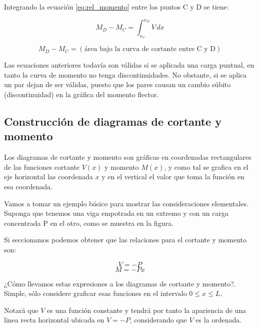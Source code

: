 \documentclass[12pt,letterpaper]{article}
\begin{document}
Integrando la ecuación \ref{eq:rel_momento} entre los puntos C y D se tiene:

\begin{equation}\label{eq:int_momento}
M_D - M_C = \int_{x_C}^{x_D} V \, dx
\end{equation}

$$ M_D - M_C = (\text{área bajo la curva de cortante entre C y D}) $$

Las ecuaciones anteriores todavía son válidas si se aplicada una carga puntual, 
en tanto la curva de momento no tenga discontinuidades. No obstante, si se 
aplica un par dejan de ser válidas, puesto que los pares causan un cambio 
súbito (discontinuidad) en la gráfica del momento flector.


\subsection{Construcción de diagramas de cortante y momento}

Los diagramas de cortante y momento son gráficas en coordenadas rectangulares de las 
funciones cortante $V(x)$ y momento $M(x)$, y como tal se grafica en el eje horizontal 
las coordenada $x$ y en el vertical el valor que toma la función en esa coordenada.

Vamos a tomar un ejemplo básico para mostrar las consideraciones elementales. Suponga 
que tenemos una viga empotrada en un extremo y con un carga concentrada P en el otro, 
como se muestra en la figura.

\begin{center}
\end{center}

Si seccionamos podemos obtener que las relaciones para el cortante y momento son:

$$ V = -P $$
$$ M = -Px $$

¿Cómo llevamos estas expresiones a los diagramas de cortante y momento?. Simple, sólo 
considere graficar esas funciones en el intervalo $0 \leq x \leq L$.

Notará que $V$ es una función constante y tendrá por tanto la apariencia de una linea 
recta horizontal ubicada en $V = -P$, considerando que $V$ es la ordenada.
\end{document}
